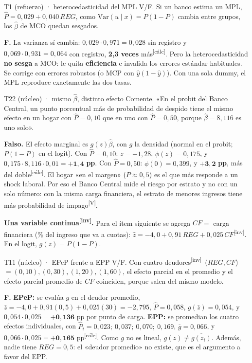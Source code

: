 \documentclass[10pt,a4paper]{article}
\newcommand{\V}{\textsuperscript{\textcolor{green!45!black}{[V]}}}
\newcommand{\inv}{\textsuperscript{\textcolor{red!60!black}{[inv]}}}
\newcommand{\calc}{\textsuperscript{\textcolor{blue!60!black}{[cálc]}}}
\newcommand{\Ph}{\hat P}
\begin{document}
\begin{enun}{T1 (refuerzo) · heterocedasticidad del MPL}
V/F. Si un banco estima un MPL, $\Ph=0{,}029+0{,}040\,REG$, como $\mathrm{Var}(u\mid x)=P(1-P)$ cambia entre grupos, los $\hat\beta$ de MCO quedan sesgados.
\end{enun}
\begin{ejemplar}
\textbf{F.} La varianza sí cambia: $0{,}029\cdot0{,}971=0{,}028$ sin registro y $0{,}069\cdot0{,}931=0{,}064$ con registro, \textbf{2,3 veces} más\calc. Pero la heterocedasticidad \textbf{no sesga} a MCO: le quita \textbf{eficiencia} e invalida los errores estándar habituales. Se corrige con errores robustos (o MCP con $\hat y(1-\hat y)$). Con una sola dummy, el MPL reproduce exactamente las dos tasas.
\end{ejemplar}

\begin{enun}{T22 (núcleo) · mismo $\hat\beta$, distinto efecto}
Comente. «En el probit del Banco Central, un punto porcentual más de probabilidad de despido tiene el mismo efecto en un hogar con $\Ph=0{,}10$ que en uno con $\Ph=0{,}50$, porque $\hat\beta=8{,}116$ es uno solo».
\end{enun}
\begin{ejemplar}
\textbf{Falso.} El efecto marginal es $g(z)\hat\beta$, con $g$ la densidad (normal en el probit; $P(1-P)$ en el logit). Con $\Ph=0{,}10$: $z=-1{,}28$, $\phi(z)=0{,}175$, y $0{,}175\cdot8{,}116\cdot0{,}01=\mathbf{+1{,}4}$ \textbf{pp}. Con $\Ph=0{,}50$: $\phi(0)=0{,}399$, y $\mathbf{+3{,}2}$ \textbf{pp}, más del doble\calc. El hogar «en el margen» ($P\approx0{,}5$) es el que más responde a un shock laboral. Por eso el Banco Central mide el riesgo por estrato y no con un solo número: con la misma carga financiera, el estrato de menores ingresos tiene más probabilidad de impago\V.
\end{ejemplar}

\textbf{Una variable continua\inv.} Para el ítem siguiente se agrega $CF=$ carga financiera (\% del ingreso que va a cuotas): $\hat z=-4{,}0+0{,}91\,REG+0{,}025\,CF$\inv. En el logit, $g(z)=P(1-P)$.

\begin{enun}{T11 (núcleo) · EPeP frente a EPP}
V/F. Con cuatro deudores\inv\ ($REG,CF$) $=(0,10),(0,30),(1,20),(1,60)$, el efecto parcial en el promedio y el efecto parcial promedio de $CF$ coinciden, porque salen del mismo modelo.
\end{enun}
\begin{ejemplar}
\textbf{F.} \textbf{EPeP:} se evalúa $g$ en el deudor promedio, $\bar z=-4{,}0+0{,}91(0{,}5)+0{,}025(30)=-2{,}795$, $\Ph=0{,}058$, $g(\bar z)=0{,}054$, y $0{,}054\cdot0{,}025=\mathbf{+0{,}136}$ pp por punto de carga. \textbf{EPP:} se promedian los cuatro efectos individuales, con $\Ph_i=0{,}023;\ 0{,}037;\ 0{,}070;\ 0{,}169$, $\overline{g}=0{,}066$, y $0{,}066\cdot0{,}025=\mathbf{+0{,}165}$ pp\calc. Como $g$ no es lineal, $g(\bar z)\neq\overline{g(z_i)}$. Además, nadie tiene $REG=0{,}5$: el «deudor promedio» no existe, que es el argumento a favor del EPP.
\end{ejemplar}
\end{document}
